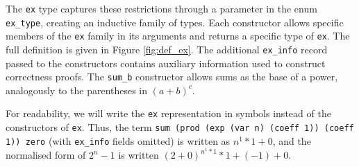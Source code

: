 \documentclass{llncs}
\newcommand{\lean}[1]{\texttt{#1}\xspace} %
\newcommand{\ex}{\lean{ex}}
\begin{document}
The \ex type captures these restrictions through a parameter in the enum \lean{ex\_type},
creating an inductive family of types.
Each constructor allows specific members of the \ex family in its arguments
and returns a specific type of \ex.
The full definition is given in Figure \ref{fig:def_ex}.
The additional \lean{ex\_info} record passed to the constructors contains auxiliary information used to construct correctness proofs.
The \lean{sum\_b} constructor allows sums as the base of a power, analogously to the parentheses in $(a + b) ^ c$.

For readability, we will write the \ex representation in symbols instead of the constructors of \ex.
Thus, the term \lean{sum (prod (exp (var n) (coeff 1)) (coeff 1)) zero} (with \lean{ex\_info} fields omitted) is written as $n^1 * 1 + 0$,
and the normalised form of $2^n - 1$ is written $(2+0)^{n^1 * 1} * 1 + (-1) + 0$.
\end{document}
